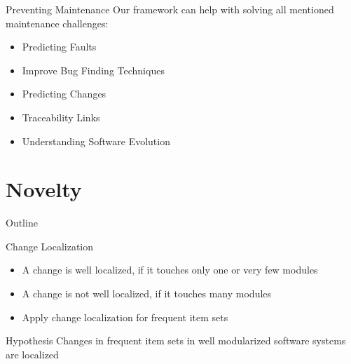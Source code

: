 \note{
}

\begin{frame}{Preventing Maintenance}
  Our framework can help with solving all mentioned maintenance
  challenges:

  \begin{itemize}
  \item Predicting Faults
  \item Improve Bug Finding Techniques
  \item Predicting Changes
  \item Traceability Links
  \item Understanding Software Evolution
  \end{itemize}
\end{frame}

\note{
}


\section{Novelty}

\begin{frame}{Outline}
  \tableofcontents[current]
\end{frame}

\note{
}

\begin{frame}{Change Localization}
  \begin{itemize}
  \item A change is well localized, if it touches only one or very few
    modules
  \item A change is not well localized, if it touches many modules
  \item Apply change localization for frequent item sets
  \end{itemize}


  \begin{block}{Hypothesis}
    Changes in frequent item sets in well modularized software systems
    are localized
  \end{block}
\end{frame}

\note{
}

